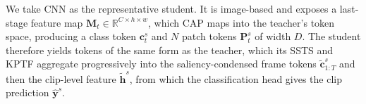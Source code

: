 %

We take CNN as the representative student.
It is image-based and exposes a last-stage feature map
$\mathbf{M}_t\in\mathbb{R}^{C\times h\times w}$, which CAP maps into the teacher's token space,
producing a class token $\mathbf{c}^{s}_t$ and $N$ patch tokens $\mathbf{P}^{s}_t$ of width $D$.
The student therefore yields tokens of the same form as the teacher, which its SSTS and KPTF
aggregate progressively into the saliency-condensed frame tokens $\tilde{\mathbf{c}}^{s}_{1:T}$ and then
the clip-level feature $\tilde{\mathbf{h}}^{s}$, from which the classification head gives the clip
prediction $\hat{\mathbf{y}}^{s}$.


